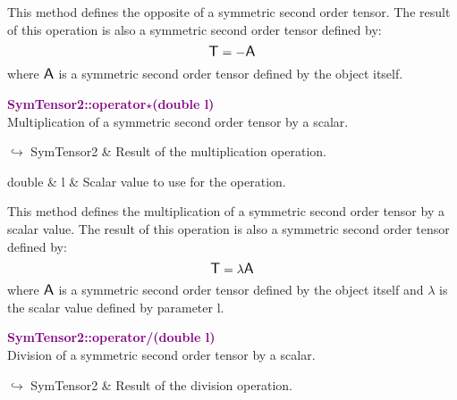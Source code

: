 This method defines the opposite of a symmetric second order tensor.
The result of this operation is also a symmetric second order tensor defined by:
\begin{equation*}
\mbox{\large\ensuremath{\mathsf{T}}} = - \mbox{\large\ensuremath{\mathsf{A}}}
\end{equation*}
where $\mbox{\large\ensuremath{\mathsf{A}}}$ is a symmetric second order tensor defined by the object itself.

\textcolor{purple}{\textbf{SymTensor2::operator$\star$(double l)}}\label{SymTensor2::operator*(double l)}\\
Multiplication of a symmetric second order tensor by a scalar.\vspace*{-0.5em}
\begin{tcolorbox}[grow to left by=-1cm, width=\textwidth-1cm,myArgs,tabularx={l|R}]
$\hookrightarrow$ SymTensor2 & Result of the multiplication operation.
\end{tcolorbox}

\begin{tcolorbox}[width=\textwidth,myArgs,tabularx={ll|R}]
double & l & Scalar value to use for the operation.
\end{tcolorbox}

This method defines the multiplication of a symmetric second order tensor by a scalar value.
The result of this operation is also a symmetric second order tensor defined by:
\begin{equation*}
\mbox{\large\ensuremath{\mathsf{T}}} = \lambda \mbox{\large\ensuremath{\mathsf{A}}}
\end{equation*}
where $\mbox{\large\ensuremath{\mathsf{A}}}$ is a symmetric second order tensor defined by the object itself and $\lambda$ is the scalar value defined by parameter l.

\textcolor{purple}{\textbf{SymTensor2::operator/(double l)}}\label{SymTensor2::operator/(double l)}\\
Division of a symmetric second order tensor by a scalar.\vspace*{-0.5em}
\begin{tcolorbox}[grow to left by=-1cm, width=\textwidth-1cm,myArgs,tabularx={l|R}]
$\hookrightarrow$ SymTensor2 & Result of the division operation.
\end{tcolorbox}

